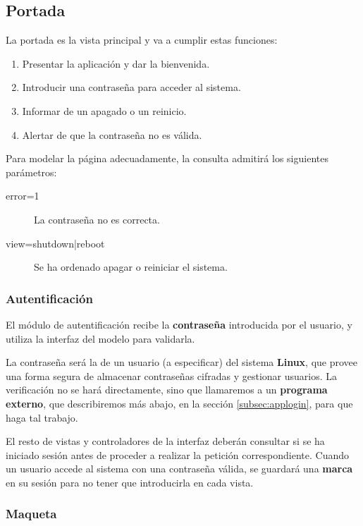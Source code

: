 \smallskip

\subsection{Portada}
\label{subsec:portada}

La portada es la vista principal y va a cumplir estas funciones:

\begin{enumerate}
	\item Presentar la aplicación y dar la bienvenida.
	\item Introducir una contraseña para acceder al sistema.
	\item Informar de un apagado o un reinicio.
	\item Alertar de que la contraseña no es válida.
\end{enumerate}

Para modelar la página adecuadamente, la consulta admitirá los siguientes parámetros:

\begin{description}
	\item[error=1] La contraseña no es correcta.
	\item[view=shutdown|reboot] Se ha ordenado apagar o reiniciar el sistema.
\end{description}

\subsubsection{Autentificación}

El módulo de autentificación recibe la \textbf{contraseña} introducida por el usuario, y utiliza la interfaz del modelo para validarla.

La contraseña será la de un usuario (a especificar) del sistema \textbf{Linux}, que provee una forma segura de almacenar contraseñas cifradas y gestionar usuarios. La verificación no se hará directamente, sino que llamaremos a un \textbf{programa externo}, que describiremos más abajo, en la sección \ref{subsec:applogin}, para que haga tal trabajo.

El resto de vistas y controladores de la interfaz deberán consultar si se ha iniciado sesión antes de proceder a realizar la petición correspondiente. Cuando un usuario accede al sistema con una contraseña válida, se guardará una \textbf{marca} en su sesión para no tener que introducirla en cada vista.


\subsubsection{Maqueta}

